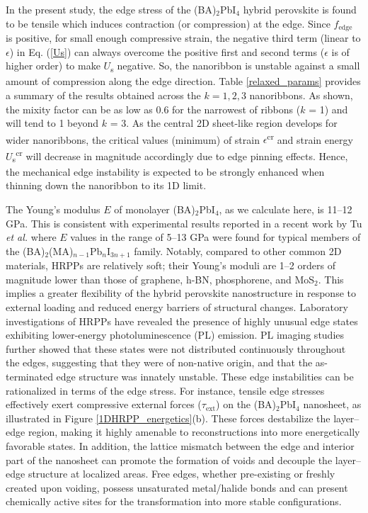 \documentclass[aps,prl,preprint,11pt,superscriptaddress,bibnotes,amsmath,amssymb,amsfonts,showkeys]{revtex4-2}
\begin{document}
In the present study, the edge stress of the (BA)$_2$PbI$_4$ hybrid perovskite is found to be tensile which induces contraction (or compression) at the edge. Since $f_{\text{edge}}$ is positive, for small enough compressive strain, the negative third term (linear to $\epsilon$) in Eq. (\ref{Us}) can always overcome the positive first and second terms ($\epsilon$ is of higher order) to make $U$\textsubscript{s} negative. So, the nanoribbon is unstable against a small amount of compression along the edge direction. Table \ref{relaxed_params} provides a summary of the results obtained across the $k = 1, 2, 3$ nanoribbons. As shown, the mixity factor can be as low as 0.6 for the narrowest of ribbons ($k$ = 1) and will tend to 1 beyond $k$ = 3. As the central 2D sheet-like region develops for wider nanoribbons, the critical values (minimum) of strain $\epsilon$\textsuperscript{cr} and strain energy $U$\textsubscript{s}\textsuperscript{cr} will decrease in magnitude accordingly due to edge pinning effects. Hence, the mechanical edge instability is expected to be strongly enhanced when thinning down the nanoribbon to its 1D limit.

The Young's modulus $E$ of monolayer (BA)$_2$PbI$_4$, as we calculate here, is 11--12 GPa. This is consistent with experimental results reported in a recent work by Tu \textit{et al.} where $E$ values in the range of 5--13 GPa were found for typical members of the (BA)$_2$(MA)$_{n-1}$Pb$_n$I$_{3n+1}$ family.\cite{TSultra2d18} Notably, compared to other common 2D materials, HRPPs are relatively soft; their Young's moduli are 1--2 orders of magnitude lower than those of graphene, h-BN, phosphorene, and MoS$_2$.\cite{FCgrbn17,WPphos14,BBmos211} This implies a greater flexibility of the hybrid perovskite nanostructure in response to external loading and reduced energy barriers of structural changes. Laboratory investigations of HRPPs have revealed the presence of highly unusual edge states exhibiting lower-energy photoluminescence (PL) emission.\cite{BTles17,QDhetedge20,ZTrevcon19,SDhumid19} PL imaging studies further showed that these states were not distributed continuously throughout the edges, suggesting that they were of non-native origin, and that the as-terminated edge structure was innately unstable. These edge instabilities can be rationalized in terms of the edge stress. For instance, tensile edge stresses effectively exert compressive external forces ($\tau_{\text{ext}}$) on the (BA)$_2$PbI$_4$ nanosheet, as illustrated in Figure \ref{1DHRPP_energetics}(b). These forces destabilize the layer--edge region, making it highly amenable to reconstructions into more energetically favorable states. In addition, the lattice mismatch between the edge and interior part of the nanosheet can promote the formation of voids and decouple the layer--edge structure at localized areas. Free edges, whether pre-existing or freshly created upon voiding, possess unsaturated metal/halide bonds and can present chemically active sites for the transformation into more stable configurations.
\end{document}
